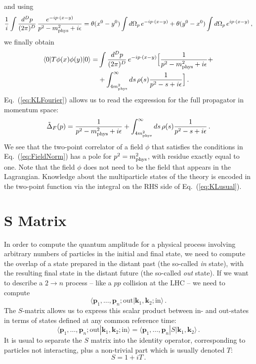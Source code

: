 and using 
\begin{align}
  \frac{1}{i} \int \frac{d^Dp}{(2\pi)^D}\,
  \frac{e^{-ip\cdot(x-y)}}{p^2-m_\mathrm{phys}^2+i\epsilon} = 
  \theta(x^0-y^0) \int d\Omega_p\, e^{-ip\cdot(x-y)} +
  \theta(y^0-x^0) \int d\Omega_p\, e^{ip\cdot(x-y)}\, , 
\end{align}
we finally obtain
\begin{align}
  \langle 0| T \phi(x) \phi(y) |0\rangle
  =& \int \frac{d^Dp}{(2\pi)^D}\,
     e^{-ip\cdot(x-y)} \Big[
     \frac{1}{p^2-m_\mathrm{phys}^2+i\epsilon} + \nonumber \\
  \label{eq:KLFourier}
  & + \int_{4m_\mathrm{phys}^2}^\infty ds\, \rho(s) \frac{1}{p^2-s+i\epsilon} 
     \Big]\, .
\end{align}
Eq.~(\ref{eq:KLFourier}) allows us to read the expression for the full
propagator in momentum space:
\begin{align}
  \label{eq:KLusual}
  \tilde{\Delta}_F(p) = \frac{1}{p^2-m_\mathrm{phys}^2+i\epsilon} 
  + \int_{4m_\mathrm{phys}^2}^\infty ds\, \rho(s) \frac{1}{p^2-s+i\epsilon}\, . 
\end{align}
We see that the two-point correlator of a field $\phi$ that satisfies
the conditions in Eq.~(\ref{eq:FieldNorm}) has a pole for
$p^2=m_\mathrm{phys}^2$, with residue exactly equal to one. Note that the field
$\phi$ does not need to be the field that appears in the
Lagrangian. Knowledge about the multiparticle states of the theory is
encoded in the two-point function via the integral on the RHS side of
Eq.~(\ref{eq:KLusual}). 

\section{S Matrix}
\label{sec:s-matrix}

In order to compute the quantum amplitude for a physical process
involving arbitrary numbers of particles in the initial and final
state, we need to compute the overlap of a state prepared in the
distant past (the so-called {\em in} state), with the resulting final
state in the distant future (the so-called {\em out} state). If
we want to describe a $2\to n$ process -- like a $pp$ collision at
the LHC -- we need to compute
\begin{equation}
  \label{eq:ScattAmpl}
  \langle \mathbf{p}_1, \ldots, \mathbf{p}_n; \mathrm{out} |
  \mathbf{k}_1, \mathbf{k}_2; \mathrm{in}\rangle\, .
\end{equation}
The $S$-matrix allows us to express this scalar product between in-
and out-states in terms of states defined at any common reference
time: 
\begin{equation}
  \label{eq:SMatDef}
   \langle \mathbf{p}_1, \ldots, \mathbf{p}_n; \mathrm{out} |
  \mathbf{k}_1, \mathbf{k}_2; \mathrm{in}\rangle = 
   \langle \mathbf{p}_1, \ldots, \mathbf{p}_n | S |
  \mathbf{k}_1, \mathbf{k}_2\rangle\, .
\end{equation}
It is usual to separate the $S$ matrix into the identity operator,
corresponding to particles not interacting, plus a non-trivial part
which is usually denoted $T$:
\begin{equation}
  \label{eq:TMatDef}
  S = 1 + i T\, .
\end{equation}


